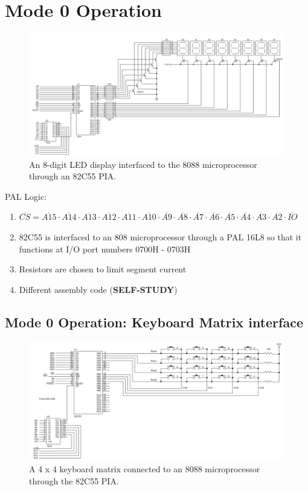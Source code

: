 \section{Mode 0 Operation}

\begin{figure}[h!]
  \includegraphics[width = 1.2\textwidth]{./figures/Mode_0_op.png}
  \caption{An 8-digit LED display interfaced to the 8088 microprocessor through an 82C55 PIA.}
\end{figure}

PAL Logic:
\begin{enumerate}
  \item $\overline{CS} = \overline{A15} \cdot \overline{A14} \cdot \overline{A13} \cdot \overline{A12} \cdot \overline{A11} \cdot \overline{A10} \cdot \overline{A9} \cdot \overline{A8} \cdot \overline{A7} \cdot \overline{A6} \cdot \overline{A5} \cdot \overline{A4} \cdot \overline{A3} \cdot \overline{A2} \cdot \overline{IO}$
  \item 82C55 is interfaced to an 808 microprocessor through a PAL 16L8 so that it functions at I/O port numbers 0700H - 0703H
  \item Resistors are chosen to limit segment current
  \item Different assembly code (\textbf{SELF-STUDY})
\end{enumerate}

\subsection{Mode 0 Operation: Keyboard Matrix interface}

\begin{figure}[h!]
  \includegraphics[width = 1.2\textwidth]{./figures/Mode_0_key.png}
  \caption{A 4 x 4 keyboard matrix connected to an 8088 microprocessor through the 82C55 PIA.}
\end{figure}

